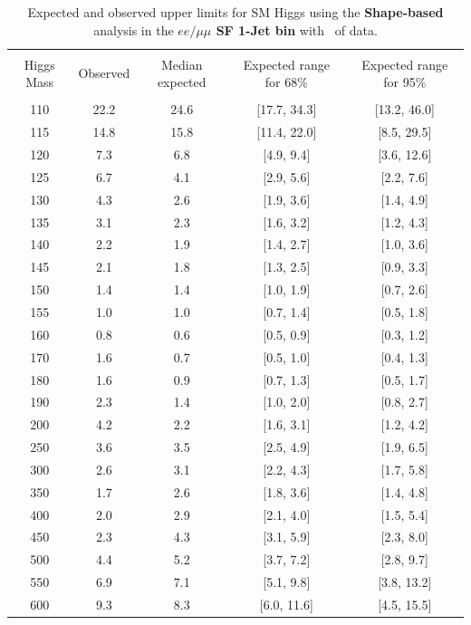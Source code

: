 \begin{table}[hbp!]
\begin{center}
\begin{tabular}{c c c c c}
\hline
\vspace{-3mm} && \\
 Higgs Mass & Observed  & Median expected & Expected range for 68\% & Expected range for 95\%   \\
\vspace{-3mm} && \\
\hline
110 & 22.2 & 24.6 & [17.7, 34.3] & [13.2, 46.0] \\
115 & 14.8 & 15.8 & [11.4, 22.0] & [8.5, 29.5] \\
120 & 7.3 & 6.8 & [4.9, 9.4] & [3.6, 12.6] \\
125 & 6.7 & 4.1 & [2.9, 5.6] & [2.2, 7.6] \\
130 & 4.3 & 2.6 & [1.9, 3.6] & [1.4, 4.9] \\
135 & 3.1 & 2.3 & [1.6, 3.2] & [1.2, 4.3] \\
140 & 2.2 & 1.9 & [1.4, 2.7] & [1.0, 3.6] \\
145 & 2.1 & 1.8 & [1.3, 2.5] & [0.9, 3.3] \\
150 & 1.4 & 1.4 & [1.0, 1.9] & [0.7, 2.6] \\
155 & 1.0 & 1.0 & [0.7, 1.4] & [0.5, 1.8] \\
160 & 0.8 & 0.6 & [0.5, 0.9] & [0.3, 1.2] \\
170 & 1.6 & 0.7 & [0.5, 1.0] & [0.4, 1.3] \\
180 & 1.6 & 0.9 & [0.7, 1.3] & [0.5, 1.7] \\
190 & 2.3 & 1.4 & [1.0, 2.0] & [0.8, 2.7] \\
200 & 4.2 & 2.2 & [1.6, 3.1] & [1.2, 4.2] \\
250 & 3.6 & 3.5 & [2.5, 4.9] & [1.9, 6.5] \\
300 & 2.6 & 3.1 & [2.2, 4.3] & [1.7, 5.8] \\
350 & 1.7 & 2.6 & [1.8, 3.6] & [1.4, 4.8] \\
400 & 2.0 & 2.9 & [2.1, 4.0] & [1.5, 5.4] \\
450 & 2.3 & 4.3 & [3.1, 5.9] & [2.3, 8.0] \\
500 & 4.4 & 5.2 & [3.7, 7.2] & [2.8, 9.7] \\
550 & 6.9 & 7.1 & [5.1, 9.8] & [3.8, 13.2] \\
600 & 9.3 & 8.3 & [6.0, 11.6] & [4.5, 15.5] \\
\hline
\end{tabular}
\caption{Expected and observed upper limits for SM Higgs using the
  {\bf Shape-based} analysis in the {\bf $ee/\mu\mu$ SF 1-Jet bin} with \intlumiEightTeV\ of data.}
\label{tab:bdtbase_uls_1jsf}
\end{center}
\end{table}
\clearpage

